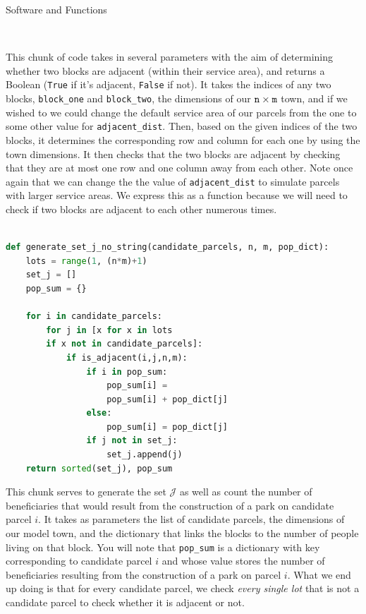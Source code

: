 \documentclass[12pt]{pom_thesis}
\theoremstyle{definition}
\begin{document}
\begin{chapter}{Software and Functions}
\begin{lstlisting}[language = Python, caption = Tells us if two blocks are bordering each other (a proxy for the service area measurement)., xleftmargin = -40pt]
	
\end{lstlisting} 


This chunk of code takes in several parameters with the aim of determining whether two blocks are adjacent (within their service area), and returns a Boolean (\verb-True- if it's adjacent, \verb-False- if not). It takes the indices of any two blocks, \verb-block_one- and \verb-block_two-, the dimensions of our $\verb-n- \times \verb-m-$ town, and if we wished to we could change the default service area of our parcels from the one to some other value for \verb-adjacent_dist-. Then, based on the given indices of the two blocks, it determines the corresponding row and column for each one by using the town dimensions. It then checks that the two blocks are adjacent by checking that they are at most one row and one column away from each other. Note once again that we can change the the value of \verb-adjacent_dist- to simulate parcels with larger service areas. We express this as a function because we will need to check if two blocks are adjacent to each other numerous times. \\ \\
%
\begin{lstlisting}[language = Python, xleftmargin= -40pt,  caption = Generates the set $\mathcal{J}.$]
def generate_set_j_no_string(candidate_parcels, n, m, pop_dict):
	lots = range(1, (n*m)+1)
	set_j = []
	pop_sum = {}

	for i in candidate_parcels:
		for j in [x for x in lots 
		if x not in candidate_parcels]:
			if is_adjacent(i,j,n,m):
				if i in pop_sum:
					pop_sum[i] = 
					pop_sum[i] + pop_dict[j]
				else:
					pop_sum[i] = pop_dict[j]
				if j not in set_j:
					set_j.append(j)
	return sorted(set_j), pop_sum
\end{lstlisting}
This chunk serves to generate the set $\mathcal{J}$ as well as count the number of beneficiaries that would result from the construction of a park on candidate parcel $i$. It takes as parameters the list of candidate parcels, the dimensions of our model town, and the dictionary that links the blocks to the number of people living on that block. You will note that \verb-pop_sum- is a dictionary with key corresponding to candidate parcel $i$ and whose value stores the number of beneficiaries resulting from the construction of a park on parcel $i$. What we end up doing is that for every candidate parcel, we check \textit{every single lot} that is not a candidate parcel to check whether it is adjacent or not. 


\end{chapter}
\end{document}
